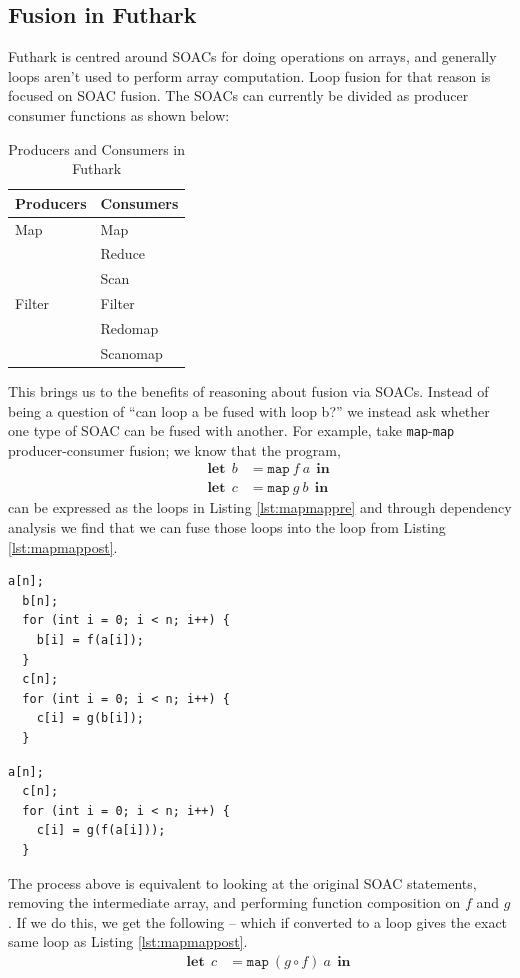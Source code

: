 \documentclass[11pt,bibliography=totocnumbered]{article}
\newcommand\lett{\phantom{-}\:\:\mathbf{let}\:\:}
\newcommand\inn{\:\:\mathbf{in}\:\:}
\begin{document}
\subsection{Fusion in Futhark}
Futhark is centred around SOACs for doing operations on arrays, and generally loops aren't used to perform array computation. Loop fusion for that reason is focused on SOAC fusion. The SOACs can currently be divided as producer consumer functions as shown below:
\begin{table}[hb!]
\centering
\caption{Producers and Consumers in Futhark}
\label{my-label}
\begin{tabular}{|l|l|}
\hline
\textbf{Producers} & \textbf{Consumers} \\ \hline
Map                & Map                \\ \hline
                   & Reduce             \\ \hline
                   & Scan               \\ \hline
Filter             & Filter             \\ \hline
                   & Redomap            \\ \hline
                   & Scanomap           \\ \hline
\end{tabular}
\end{table}

This brings us to the benefits of reasoning about fusion via SOACs. Instead of being a question of ``can loop a be fused with loop b?'' we instead ask whether one type of SOAC can
 be fused with another. For example, take \texttt{map}-\texttt{map} producer-consumer fusion; we know that the program,
 \begin{align*}
   \lett b &= \mathtt{map} \: f \: a \inn \\
   \lett c &= \mathtt{map} \: g \: b \inn
 \end{align*}
can be expressed as the loops in Listing \ref{lst:mapmappre}
 and through dependency analysis we find that we can fuse those loops into the loop from Listing \ref{lst:mapmappost}.
\begin{lstlisting}[caption=\texttt{map} and \texttt{map} as producer and consumer, label={lst:mapmappre}]
  a[n];  	  
  b[n];
  for (int i = 0; i < n; i++) {
    b[i] = f(a[i]);
  }
  c[n];
  for (int i = 0; i < n; i++) {
    c[i] = g(b[i]);
  }
\end{lstlisting}
\begin{lstlisting}[caption=Loop from Listing \ref{lst:mapmappre} fused as producer and consumer, label={lst:mapmappost}]
  a[n];  	  
  c[n];
  for (int i = 0; i < n; i++) {
    c[i] = g(f(a[i]));
  }
\end{lstlisting}
The process above is equivalent to looking at the original SOAC statements, removing the intermediate array, and performing function composition on $f$ and $g$. If
 we do this, we get the following -- which if converted to a loop gives the exact same loop as Listing \ref{lst:mapmappost}.
 \begin{align*}
   \lett c &= \mathtt{map} \: (g \circ f) \: a \inn
 \end{align*}
\end{document}
